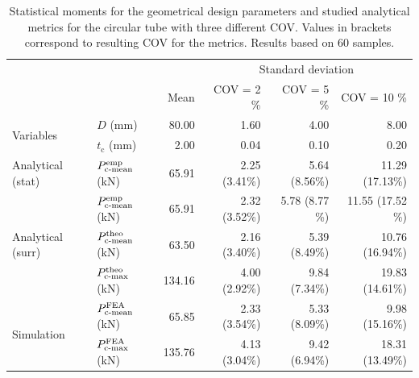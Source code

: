 \documentclass[12pt,number,preprint,review,times]{elsarticle}
\begin{document}
\begin{table}[!htpb]
\begin{center}
\begin{tabular}[t]{llrrrr} \toprule
 & &  &  \multicolumn{3}{c}{Standard deviation}  \\\cmidrule{4-6}
&  & Mean       &    COV = 2 \%  &  COV = 5 \%      &    COV = 10 \%  \\\midrule
\multirow{2}{*}{Variables} & $D$ (mm) &  80.00 &  1.60 & 4.00 & 8.00   \\
& $t_\mathrm{c}$ (mm) &  2.00 & 0.04 & 0.10 & 0.20 \\ \midrule
\multirow{1}{*}{Analytical (stat)} & $P^{\mathrm{emp}}_{\mathrm{c{\text -}mean}}$ (kN) &  65.91 & 2.25 (3.41\%) & 5.64 (8.56\%) &  11.29 (17.13\%)   \\\midrule
\multirow{3}{*}{Analytical (surr)} & $P^{\mathrm{emp}}_{\mathrm{c{\text -}mean}}$ (kN) &  65.91 &  2.32 (3.52\%) & 5.78 (8.77 \%) & 11.55 (17.52 \%)  \\
& $P^{\mathrm{theo}}_{\mathrm{c{\text -}mean}}$ (kN) & 63.50  & 2.16 (3.40\%) & 5.39 (8.49\%) & 10.76 (16.94\%) \\
& $P^{\mathrm{theo}}_{\mathrm{c{\text -}max}}$ (kN) & 134.16  & 4.00 (2.92\%) & 9.84 (7.34\%) & 19.83 (14.61\%) \\ \midrule
\multirow{2}{*}{Simulation} & $P^{\mathrm{FEA}}_{\mathrm{c{\text -}mean}}$ (kN) &  65.85 & 2.33 (3.54\%) & 5.33 (8.09\%) & 9.98 (15.16\%)  \\
& $P^{\mathrm{FEA}}_{\mathrm{c{\text -}max}}$ (kN) &  135.76  & 4.13 (3.04\%) & 9.42 (6.94\%) & 18.31 (13.49\%) \\
\bottomrule
\end{tabular}
\captionsetup{justification=centering}
\caption{Statistical moments for the geometrical design parameters and studied analytical metrics for the circular tube with three different COV. Values in brackets correspond to resulting COV for the metrics. Results based on 60 samples.}
\label{tab:UQ_circ1}
\end{center}
\end{table}
\end{document}
